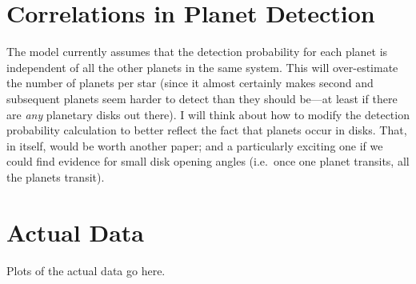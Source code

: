 \documentclass[modern]{aastex62}
\begin{document}
\section{Correlations in Planet Detection}

The model currently assumes that the detection probability for each planet is
independent of all the other planets in the same system.  This will
over-estimate the number of planets per star (since it almost certainly makes
second and subsequent planets seem harder to detect than they should be---at
least if there are \emph{any} planetary disks out there).  I will think about
how to modify the detection probability calculation to better reflect the fact
that planets occur in disks.  That, in itself, would be worth another paper; and
a particularly exciting one if we could find evidence for small disk opening
angles (i.e.\ once one planet transits, all the planets transit).

\section{Actual Data}

Plots of the actual data go here.


\end{document}
